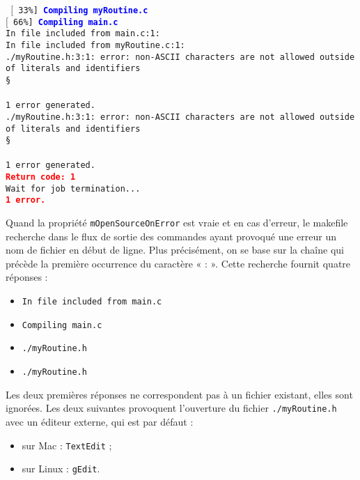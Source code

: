 \documentclass[a4paper,11pt]{extarticle}
\begin{document}
\begin{mdframed}[hidealllines=true,backgroundcolor=lightgray!20]
\noindent\texttt{\footnotesize
$[$~33\%]~\textcolor{blue}{\bf Compiling myRoutine.c}\\
$[$~66\%]~\textcolor{blue}{\bf Compiling main.c}\\
In file included from main.c:1:\\
In file included from myRoutine.c:1:\\
./myRoutine.h:3:1: error: non-ASCII characters are not allowed outside of literals and identifiers\\
\S\\
\^\\
1 error generated.\\
./myRoutine.h:3:1: error: non-ASCII characters are not allowed outside of literals and identifiers\\
\S\\
\^\\
1 error generated.\\
\textcolor{red}{\bf Return code: 1}\\
Wait for job termination...\\
\textcolor{red}{\bf 1 error.}
}
\end{mdframed}

Quand la propriété \texttt{mOpenSourceOnError} est vraie et en cas d'erreur, le makefile recherche dans le flux de sortie des commandes ayant provoqué une erreur un nom de fichier en début de ligne. Plus précisément, on se base sur la chaîne qui précède la première occurrence du caractère « : ». Cette recherche fournit quatre réponses :
\begin{itemize}
\item \colorbox{lightgray!20}{\tt In file included from main.c}
\item \colorbox{lightgray!20}{\tt Compiling main.c}
\item \colorbox{lightgray!20}{\tt ./myRoutine.h}
\item \colorbox{lightgray!20}{\tt ./myRoutine.h}
\end{itemize}

Les deux premières réponses ne correspondent pas à un fichier existant, elles sont ignorées. Les deux suivantes provoquent l'ouverture du fichier \texttt{./myRoutine.h} avec un éditeur externe, qui est par défaut :
\begin{itemize}
\item sur Mac : \texttt{TextEdit} ;
\item sur Linux : \texttt{gEdit}.
\end{itemize}
\end{document}
